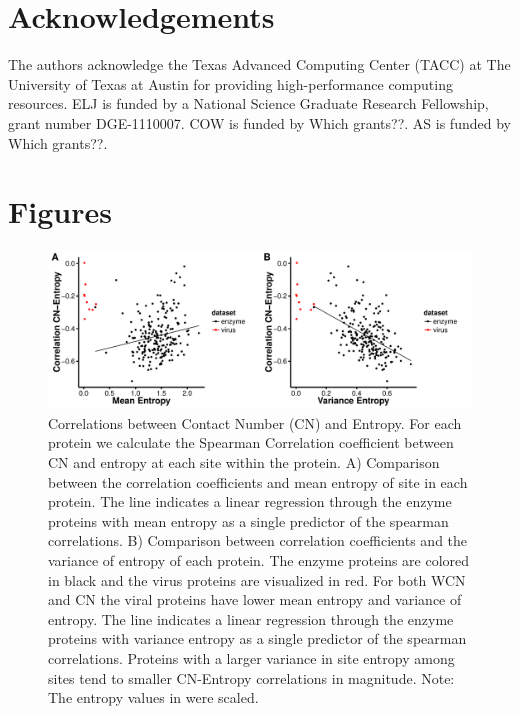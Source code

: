 \documentclass[12pt]{article}
\begin{document}
\section{Acknowledgements}
The authors acknowledge the Texas Advanced Computing Center (TACC) at The University of Texas at Austin for providing high-performance computing resources. ELJ is funded by a National Science Graduate Research Fellowship, grant number DGE-1110007. COW is funded by {\color{red} Which grants??}.  AS is funded by {\color{red} Which grants??}.


\cleardoublepage
\section*{Figures}

    \begin{figure}[H]
            \centerline{\includegraphics[width=7.5in]{entropy_cn_cor.pdf}}     
            \caption{Correlations between Contact Number (CN) and Entropy. For each protein we calculate the Spearman Correlation coefficient between CN and entropy at each site within the protein. A) Comparison between the correlation coefficients and mean entropy of site in each protein. The line indicates a linear regression through the enzyme proteins with mean entropy as a single predictor of the spearman correlations. B) Comparison between correlation coefficients and the variance of entropy of each protein. The enzyme proteins are colored in black and the virus proteins are visualized in red. For both WCN and CN the viral proteins have lower mean entropy and variance of entropy. The line indicates a linear regression through the enzyme proteins with variance entropy as a single predictor of the spearman correlations. Proteins with a larger variance in site entropy among sites tend to smaller CN-Entropy correlations in magnitude. Note: The entropy values in \cite{Shahmoradietal2014} were scaled.}
            \label{fig:entropy_cn_cor}
    \end{figure}
\end{document}
